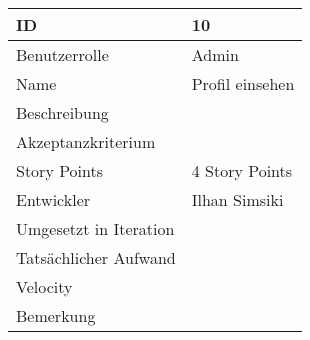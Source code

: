 \begin{tabularx}{\textwidth}{|p{}|X|}
	\hline
	ID & 10\\
	\hline
	Benutzerrolle & Admin\\
	\hline
	Name & Profil einsehen\\
	\hline
	Beschreibung & \\
	\hline
	Akzeptanzkriterium & \\
	\hline
	Story Points & 4 Story Points\\
	\hline
	Entwickler & Ilhan Simsiki\\
	\hline
	Umgesetzt in Iteration & \\
	\hline
	Tatsächlicher Aufwand & \\
	\hline
	Velocity & \\
	\hline
	Bemerkung & \\
	\hline
\end{tabularx}
\vspace{20pt}
